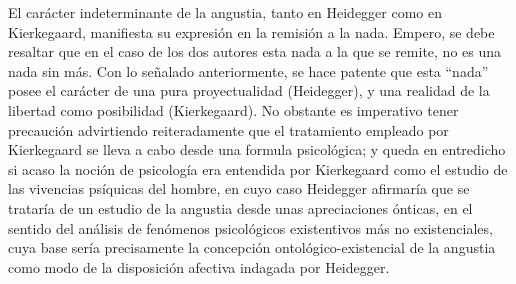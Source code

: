 \begin{refsection}
El carácter indeterminante de la angustia, tanto en Heidegger como en Kierkegaard, manifiesta su expresión en la remisión a la nada. Empero, se debe resaltar que en el caso de los dos autores esta nada a la que se remite, no es una nada sin más. Con lo señalado anteriormente, se hace patente que esta ``nada'' posee el carácter de una pura proyectualidad (Heidegger), y una realidad de la libertad como posibilidad (Kierkegaard). No obstante es imperativo tener precaución advirtiendo reiteradamente que el tratamiento empleado por Kierkegaard se lleva a cabo desde una formula psicológica; y queda en entredicho si acaso la noción de psicología era entendida por Kierkegaard como el estudio de las vivencias psíquicas del hombre, en cuyo caso Heidegger afirmaría que se trataría de un estudio de la angustia desde unas apreciaciones ónticas, en el sentido del análisis de fenómenos psicológicos existentivos más no existenciales, cuya base sería precisamente la concepción ontológico-existencial de la angustia como modo de la disposición afectiva indagada por Heidegger.


\end{refsection}
